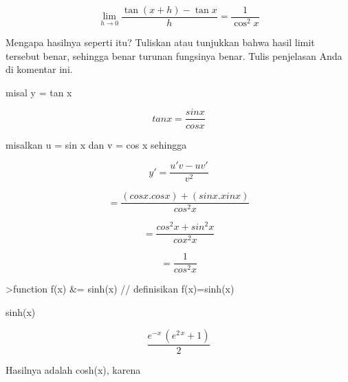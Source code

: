 \documentclass{article}
\begin{document}
\begin{eulernotebook}
\begin{eulercomment}
\begin{eulercomment}
\begin{eulercomment}
\begin{eulercomment}
\begin{eulercomment}
\begin{eulercomment}
\begin{eulerformula}
\[
\lim_{h\rightarrow 0}{\frac{\tan \left(x+h\right)-\tan x}{h}}=  \frac{1}{\cos ^2x}
\]
\end{eulerformula}
\begin{eulercomment}
Mengapa hasilnya seperti itu? Tuliskan atau tunjukkan bahwa hasil
limit tersebut benar, sehingga benar turunan fungsinya benar. Tulis
penjelasan Anda di komentar ini.

\end{eulercomment}
\begin{eulercomment}
misal y = tan x\\
\end{eulercomment}
\begin{eulerformula}
\[
tan x = \frac{sin x}{cos x}
\]
\end{eulerformula}
\begin{eulercomment}
misalkan u = sin x dan v = cos x sehingga\\
\end{eulercomment}
\begin{eulerformula}
\[
y'=\frac{u'v-uv'}{v^{2}}
\]
\end{eulerformula}
\begin{eulerformula}
\[
= \frac{(cos x.cos x)+(sin x.xin x)}{cos^{2}x}
\]
\end{eulerformula}
\begin{eulerformula}
\[
= \frac{cos^{2}x+sin^{2}x}{cox^{2}x}
\]
\end{eulerformula}
\begin{eulerformula}
\[
= \frac{1}{cos^{2}x}
\]
\end{eulerformula}
\begin{eulerprompt}
>function f(x) &= sinh(x) // definisikan f(x)=sinh(x)
\end{eulerprompt}
\begin{euleroutput}
  
                                 sinh(x)
  
\end{euleroutput}
\begin{eulerformula}
\[
\frac{e^ {- x }\,\left(e^{2\,x}+1\right)}{2}
\]
\end{eulerformula}
\begin{eulercomment}
Hasilnya adalah cosh(x), karena


\end{eulercomment}
\end{eulercomment}
\end{eulercomment}
\end{eulercomment}
\end{eulercomment}
\end{eulercomment}
\end{eulercomment}
\end{eulernotebook}
\end{document}
